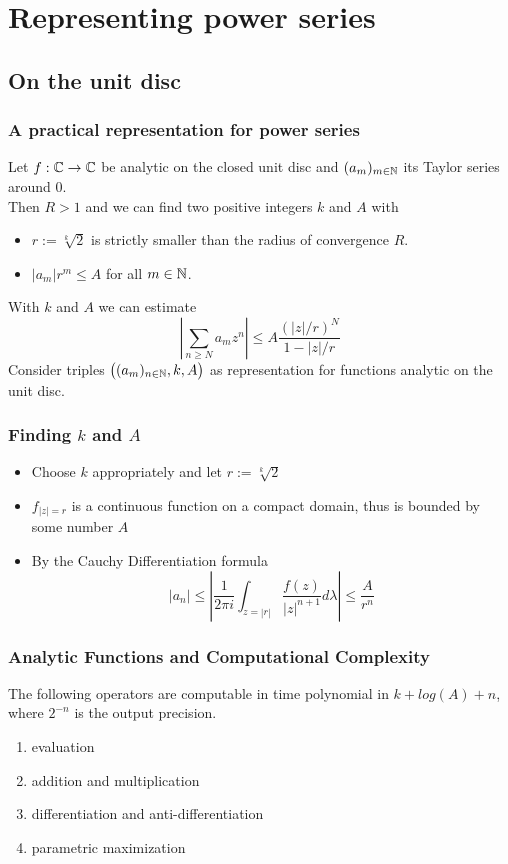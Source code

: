 
\section{Representing power series}
\subsection{On the unit disc}
\begin{frame}
\frametitle{A practical representation for power series}
\begin{lemma}
Let $f : \mathbb{C} \to \mathbb{C}$ be analytic on the closed unit disc and $(a_m)_{m\in\mathbb{N}}$ its Taylor series around $0$.\\
Then $R>1$ \pause and we can find two positive integers $k$ and $A$ with 
\begin{itemize}[<+->]
\item $r := \sqrt[k]{2}$ is strictly smaller than the radius of convergence $R$.
\item $|a_m|r^m \leq A$ for all $m \in \mathbb{N}$.
\end{itemize}
\end{lemma}
\pause
With $k$ and $A$ we can estimate 
$$ \left | \sum_{n \geq N} a_m z^n \right | \leq A\frac{(|z|/r)^N}{1-|z|/r} $$\pause
Consider triples $\big((a_m)_{n \in \mathbb{N}}, k, A\big)$ as representation for functions analytic on the unit disc.
\end{frame}
\begin{frame}[<+->]
\frametitle{Finding $k$ and $A$}
\begin{itemize}[<+->]
\item Choose $k$ appropriately and let $r := \sqrt[k]{2}$
\item $f_{|z|=r}$ is a continuous function on a compact domain, thus is bounded by some number $A$
\item By the Cauchy Differentiation formula $$|a_n| \leq |\frac{1}{2\pi i}\int_{z=|r|} \frac{f(z)}{|z|^{n+1}} d \lambda| \leq \frac{A}{r^n}$$
\end{itemize}
\end{frame}
\begin{frame}[<+->]
\frametitle{Analytic Functions and Computational Complexity}
\begin{theorem}
  The following operators are computable in time polynomial in $k+log(A)+n$, where $2^{-n}$ is the output precision.
\begin{enumerate}
\item evaluation
\item addition and multiplication
\item differentiation and anti-differentiation
\item parametric maximization
\end{enumerate}
\end{theorem}
\end{frame}
